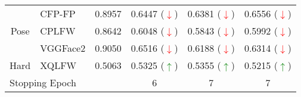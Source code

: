 \documentclass[class=report, crop=false, a4paper, 12pt]{standalone}
\begin{document}
\begin{table}[H]
{\begin{tabular}{|clc|c|c|c|}
    \multicolumn{1}{|c|}{}                          & \multicolumn{1}{l|}{CFP-FP}   & {\color[HTML]{333333} 0.8957} & {\color[HTML]{333333} 0.6447 (\textcolor{red}{$\downarrow$})} & {\color[HTML]{333333} 0.6381 (\textcolor{red}{$\downarrow$})} & {\color[HTML]{333333} 0.6556 (\textcolor{red}{$\downarrow$})} \\ \cline{2-6} 
    \multicolumn{1}{|c|}{\multirow{-2}{*}{Pose}}    & \multicolumn{1}{l|}{CPLFW}    & {\color[HTML]{333333} 0.8642} & {\color[HTML]{333333} 0.6048 (\textcolor{red}{$\downarrow$})} & {\color[HTML]{333333} 0.5843 (\textcolor{red}{$\downarrow$})} & {\color[HTML]{333333} 0.5992 (\textcolor{red}{$\downarrow$})} \\ \hline
    \multicolumn{1}{|c|}{}                          & \multicolumn{1}{l|}{VGGFace2} & {\color[HTML]{333333} 0.9050} & {\color[HTML]{333333} 0.6516 (\textcolor{red}{$\downarrow$})} & {\color[HTML]{333333} 0.6188 (\textcolor{red}{$\downarrow$})} & {\color[HTML]{333333} 0.6314 (\textcolor{red}{$\downarrow$})} \\ \cline{2-6} 
    \multicolumn{1}{|c|}{\multirow{-2}{*}{Hard}}    & \multicolumn{1}{l|}{XQLFW}    & {\color[HTML]{333333} 0.5063} & {\color[HTML]{333333} 0.5325 (\textcolor{green}{$\uparrow$})}   & {\color[HTML]{333333} 0.5355 (\textcolor{green}{$\uparrow$})}   & {\color[HTML]{333333} 0.5215 (\textcolor{green}{$\uparrow$})}   \\ \hline
    \multicolumn{3}{|l|}{Stopping Epoch}                                                                            & 6                                  & 7                                  & 7                                  \\ \hline
    \end{tabular}%
    }
\end{table}
\end{document}
